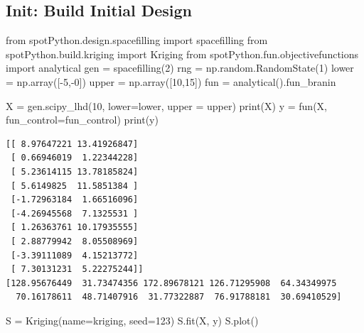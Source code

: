 \documentclass[
  letterpaper,
  DIV=11,
  numbers=noendperiod]{scrreprt}
\newenvironment{Shaded}{\begin{snugshade}}{\end{snugshade}}
\newcommand{\BuiltInTok}[1]{\textcolor[rgb]{0.00,0.23,0.31}{#1}}
\newcommand{\DecValTok}[1]{\textcolor[rgb]{0.68,0.00,0.00}{#1}}
\newcommand{\ImportTok}[1]{\textcolor[rgb]{0.00,0.46,0.62}{#1}}
\newcommand{\NormalTok}[1]{\textcolor[rgb]{0.00,0.23,0.31}{#1}}
\newcommand{\OperatorTok}[1]{\textcolor[rgb]{0.37,0.37,0.37}{#1}}
\newcommand{\StringTok}[1]{\textcolor[rgb]{0.13,0.47,0.30}{#1}}
\begin{document}
\hypertarget{init-build-initial-design}{%
\subsection{Init: Build Initial
Design}\label{init-build-initial-design}}

\begin{Shaded}
\begin{Highlighting}[]
\ImportTok{from}\NormalTok{ spotPython.design.spacefilling }\ImportTok{import}\NormalTok{ spacefilling}
\ImportTok{from}\NormalTok{ spotPython.build.kriging }\ImportTok{import}\NormalTok{ Kriging}
\ImportTok{from}\NormalTok{ spotPython.fun.objectivefunctions }\ImportTok{import}\NormalTok{ analytical}
\NormalTok{gen }\OperatorTok{=}\NormalTok{ spacefilling(}\DecValTok{2}\NormalTok{)}
\NormalTok{rng }\OperatorTok{=}\NormalTok{ np.random.RandomState(}\DecValTok{1}\NormalTok{)}
\NormalTok{lower }\OperatorTok{=}\NormalTok{ np.array([}\OperatorTok{{-}}\DecValTok{5}\NormalTok{,}\OperatorTok{{-}}\DecValTok{0}\NormalTok{])}
\NormalTok{upper }\OperatorTok{=}\NormalTok{ np.array([}\DecValTok{10}\NormalTok{,}\DecValTok{15}\NormalTok{])}
\NormalTok{fun }\OperatorTok{=}\NormalTok{ analytical().fun\_branin}

\NormalTok{X }\OperatorTok{=}\NormalTok{ gen.scipy\_lhd(}\DecValTok{10}\NormalTok{, lower}\OperatorTok{=}\NormalTok{lower, upper }\OperatorTok{=}\NormalTok{ upper)}
\BuiltInTok{print}\NormalTok{(X)}
\NormalTok{y }\OperatorTok{=}\NormalTok{ fun(X, fun\_control}\OperatorTok{=}\NormalTok{fun\_control)}
\BuiltInTok{print}\NormalTok{(y)}
\end{Highlighting}
\end{Shaded}

\begin{verbatim}
[[ 8.97647221 13.41926847]
 [ 0.66946019  1.22344228]
 [ 5.23614115 13.78185824]
 [ 5.6149825  11.5851384 ]
 [-1.72963184  1.66516096]
 [-4.26945568  7.1325531 ]
 [ 1.26363761 10.17935555]
 [ 2.88779942  8.05508969]
 [-3.39111089  4.15213772]
 [ 7.30131231  5.22275244]]
[128.95676449  31.73474356 172.89678121 126.71295908  64.34349975
  70.16178611  48.71407916  31.77322887  76.91788181  30.69410529]
\end{verbatim}

\begin{Shaded}
\begin{Highlighting}[]
\NormalTok{S }\OperatorTok{=}\NormalTok{ Kriging(name}\OperatorTok{=}\StringTok{\textquotesingle{}kriging\textquotesingle{}}\NormalTok{,  seed}\OperatorTok{=}\DecValTok{123}\NormalTok{)}
\NormalTok{S.fit(X, y)}
\NormalTok{S.plot()}
\end{Highlighting}
\end{Shaded}
\end{document}
